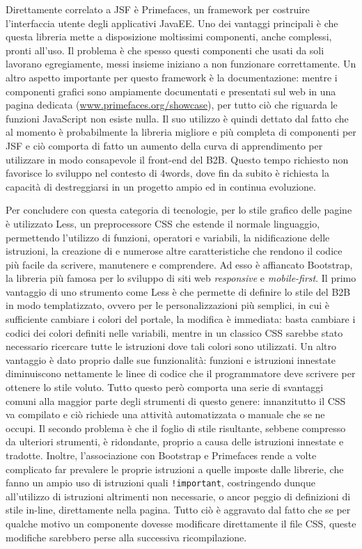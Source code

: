 Direttamente correlato a JSF è Primefaces, un framework per costruire l'interfaccia utente degli applicativi JavaEE. Uno dei vantaggi principali è che questa libreria mette a disposizione moltissimi componenti, anche complessi, pronti all'uso. Il problema è che spesso questi componenti che usati da soli lavorano egregiamente, messi insieme iniziano a non funzionare correttamente. Un altro aspetto importante per questo framework è la documentazione: mentre i componenti grafici sono ampiamente documentati e presentati sul web in una pagina dedicata (\url{www.primefaces.org/showcase}), per tutto ciò che riguarda le funzioni JavaScript non esiste nulla. Il suo utilizzo è quindi dettato dal fatto che al momento è probabilmente la libreria migliore e più completa di componenti per JSF e ciò comporta di fatto un aumento della curva di apprendimento per utilizzare in modo consapevole il front-end del B2B. Questo tempo richiesto non favorisce lo sviluppo nel contesto di 4words, dove fin da subito è richiesta la capacità di destreggiarsi in un progetto ampio ed in continua evoluzione.

Per concludere con questa categoria di tecnologie, per lo stile grafico delle pagine è utilizzato Less, un preprocessore CSS che estende il normale linguaggio, permettendo l'utilizzo di funzioni, operatori e variabili, la nidificazione delle istruzioni, la creazione di  e numerose altre caratteristiche che rendono il codice più facile da scrivere, manutenere e comprendere.\autocite{bib:wikipedia} Ad esso è affiancato Bootstrap, la libreria più famosa per lo sviluppo di siti web \textit{responsive} e \textit{mobile-first}. Il primo vantaggio di uno strumento come Less è che permette di definire lo stile del B2B in modo templatizzato, ovvero per le personalizzazioni più semplici, in cui è sufficiente cambiare i colori del portale, la modifica è immediata: basta cambiare i codici dei colori definiti nelle variabili, mentre in un classico CSS sarebbe stato necessario ricercare tutte le istruzioni dove tali colori sono utilizzati. Un altro vantaggio è dato proprio dalle sue funzionalità: funzioni e istruzioni innestate diminuiscono nettamente le linee di codice che il programmatore deve scrivere per ottenere lo stile voluto. Tutto questo però comporta una serie di svantaggi comuni alla maggior parte degli strumenti di questo genere: innanzitutto il CSS va compilato e ciò richiede una attività automatizzata o manuale che se ne occupi. Il secondo problema è che il foglio di stile risultante, sebbene compresso da ulteriori strumenti, è ridondante, proprio a causa delle istruzioni innestate e tradotte. Inoltre, l'associazione con Bootstrap e Primefaces rende a volte complicato far prevalere le proprie istruzioni a quelle imposte dalle librerie, che fanno un ampio uso di istruzioni quali \texttt{!important}, costringendo dunque all'utilizzo di istruzioni altrimenti non necessarie, o ancor peggio di definizioni di stile in-line, direttamente nella pagina. Tutto ciò è aggravato dal fatto che se per qualche motivo un componente dovesse modificare direttamente il file CSS, queste modifiche sarebbero perse alla successiva ricompilazione.

